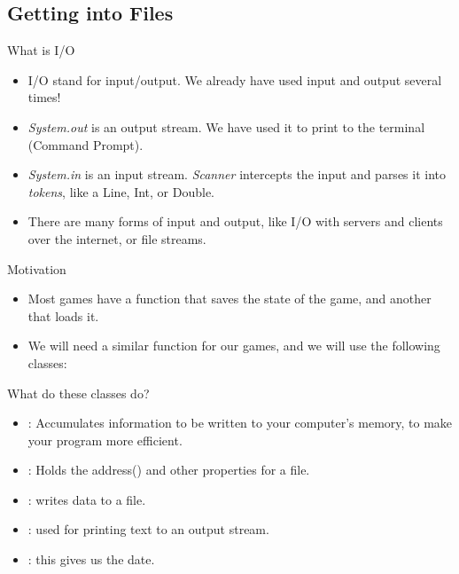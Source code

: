 \subsection{Getting into Files}
\begin{frame}{What is I/O}
\begin{itemize}
\item I/O stand for input/output. We already have used input and output several times!
\item \emph{System.out} is an output stream. We have used it to print to the terminal (Command Prompt). \pause
\item \emph{System.in} is an input stream. \emph{Scanner} intercepts the input and parses it into \emph{tokens}, like a Line, Int, or Double. \pause
\item There are many forms of input and output, like I/O with servers and clients over the internet, or file streams. \pause
\end{itemize}
\end{frame}

\begin{frame}{Motivation}
\begin{itemize}
\item Most games have a function that saves the state of the game, and another that loads it. \pause
\item We will need a similar function for our games, and we will use the following classes:\\
\end{itemize}
\end{frame}

\begin{frame}{What do these classes do?}
\begin{itemize}
\item {}: Accumulates information to be written to your computer's memory, to make your program more efficient.
\item {}: Holds the address() and other properties for a file. \pause
\item {}: writes data to a file. \pause
\item {}: used for printing text to an output stream. \pause
\item {}: this gives us the date. \pause
\end{itemize}
\end{frame}


